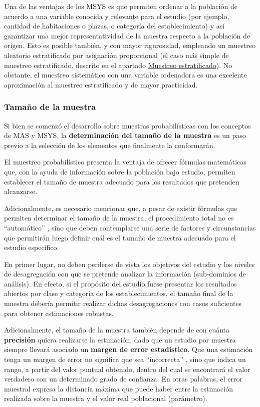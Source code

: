 \documentclass[
]{book}
\begin{document}
Una de las ventajas de los MSYS es que permiten ordenar a la población de acuerdo a una variable conocida y relevante para el estudio (por ejemplo, cantidad de habitaciones o plazas, o categoría del establecimiento) y así garantizar una mejor representatividad de la muestra respecto a la población de origen. Esto es posible también, y con mayor rigurosidad, empleando un muestreo aleatorio estratificado por asignación proporcional (el caso más simple de muestreo estratificado, descrito en el apartado \protect\hyperlink{muestreo-estratificado}{Muestreo estratificado}). No obstante, el muestreo sistemático con una variable ordenadora es una excelente aproximación al muestreo estratificado y de mayor practicidad.

\hypertarget{tamauxf1o-de-la-muestra}{%
\subsubsection{Tamaño de la muestra}\label{tamauxf1o-de-la-muestra}}

Si bien se comenzó el desarrollo sobre muestras probabilísticas con los conceptos de MAS y MSYS, la \textbf{determinación del tamaño de la muestra} es un paso previo a la selección de los elementos que finalmente la conformarán.

El muestreo probabilístico presenta la ventaja de ofrecer fórmulas matemáticas que, con la ayuda de información sobre la población bajo estudio, permiten establecer el tamaño de muestra adecuado para los resultados que pretenden alcanzarse.

Adicionalmente, es necesario mencionar que, a pesar de existir fórmulas que permiten determinar el tamaño de la muestra, el procedimiento total no es ``automático'' , sino que deben contemplarse una serie de factores y circunstancias que permitirán luego definir cuál es el tamaño de muestra adecuado para el estudio específico.

En primer lugar, no deben perderse de vista los objetivos del estudio y los niveles de desagregación con que se pretende analizar la información (sub-dominios de análisis). En efecto, si el propósito del estudio fuese presentar los resultados abiertos por clase y categoría de los establecimientos, el tamaño final de la muestra debería permitir realizar dichas desagregaciones con casos suficientes para obtener estimaciones robustas.

Adicionalmente, el tamaño de la muestra también depende de con cuánta \textbf{precisión} quiera realizarse la estimación, dado que un estudio por muestra siempre llevará asociado un \textbf{margen de error estadístico}. Que una estimación tenga un margen de error no significa que sea ``incorrecta'' , sino que indica un rango, a partir del valor puntual obtenido, dentro del cual se encontrará el valor verdadero con un determinado grado de confianza. En otras palabras, el error muestral expresa la distancia máxima que puede haber entre la estimación realizada sobre la muestra y el valor real poblacional (parámetro).
\end{document}
